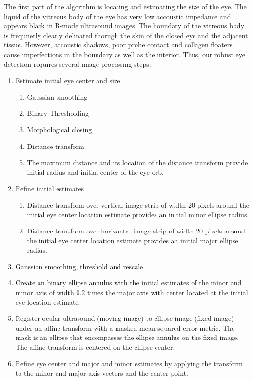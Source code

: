 \documentclass{llncs}
\begin{document}
The first part of the algorithm is locating and estimating the size of the eye.
The liquid of the vitreous body of the eye has very low accoustic impedance and
appears black in B-mode ultrasound images. The boundary of the vitreous body is
frequnetly clearly delinated thorugh the skin of the closed eye and the adjacent
tissue. However, accoustic shadows, poor probe contact and collagen floaters
cause imperfections in the boundary as well as the interior. Thus, our robust
eye detection requires several image processing steps: 
\begin{enumerate}
\item Estimate initial eye center and size
  \begin{enumerate}
  \item Gaussian smoothing
  \item Binary Thresholding
  \item Morphological closing
  \item Distance transform 
  \item The maximum distance and its location of the distance transform provide
        initial radius and initial center of the eye orb. 
  \end{enumerate}
\item Refine initial estimates
  \begin{enumerate}
  \item Distance transform over vertical image strip of width 20 pixels
        around the initial eye center location estimate provides an initial
        minor ellipse radius.
  \item Distance transform over horizontal image strip of width 20 pixels 
        around the initial eye center location estimate provides an initial major
        ellipse radius.
  \end{enumerate}
\item Gaussian smoothing, threshold and rescale
\item Create an binary ellipse annulus with the initial estimates of the minor and
      minor axis of width $0.2$ times the major axis with center located at the
      initial eye location estimate.
\item Register ocular ultrasound (moving image) to ellipse image (fixed image)
      under an affine transform with a masked mean squared error metric. The
      mask is an ellipse that encompasses the ellipse annulus on the fixed
      image. The affine transform is centered on the ellipse center.
\item Refine eye center and major and minor estimates by applying the transform to
      the minor and major axis vectors and the center point.
\end{enumerate}
\end{document}
